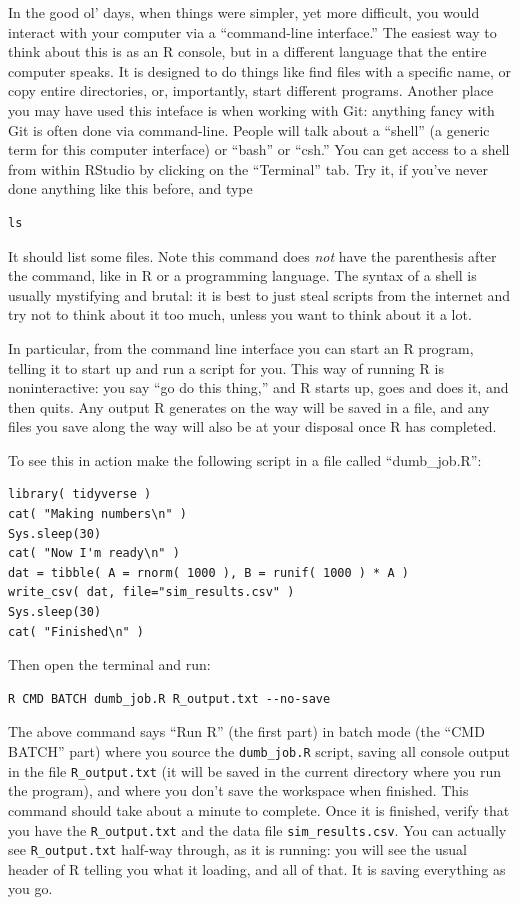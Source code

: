 \documentclass[
]{book}
\begin{document}
In the good ol' days, when things were simpler, yet more difficult, you would interact with your computer via a ``command-line interface.''
The easiest way to think about this is as an R console, but in a different language that the entire computer speaks.
It is designed to do things like find files with a specific name, or copy entire directories, or, importantly, start different programs.
Another place you may have used this inteface is when working with Git: anything fancy with Git is often done via command-line.
People will talk about a ``shell'' (a generic term for this computer interface) or ``bash'' or ``csh.''
You can get access to a shell from within RStudio by clicking on the ``Terminal'' tab.
Try it, if you've never done anything like this before, and type

\begin{verbatim}
ls
\end{verbatim}

It should list some files. Note this command does \emph{not} have the parenthesis after the command, like in R or a programming language.
The syntax of a shell is usually mystifying and brutal: it is best to just steal scripts from the internet and try not to think about it too much, unless you want to think about it a lot.

In particular, from the command line interface you can start an R program, telling it to start up and run a script for you.
This way of running R is noninteractive: you say ``go do this thing,'' and R starts up, goes and does it, and then quits.
Any output R generates on the way will be saved in a file, and any files you save along the way will also be at your disposal once R has completed.

To see this in action make the following script in a file called ``dumb\_job.R'':

\begin{verbatim}
library( tidyverse )
cat( "Making numbers\n" )
Sys.sleep(30)
cat( "Now I'm ready\n" )
dat = tibble( A = rnorm( 1000 ), B = runif( 1000 ) * A )
write_csv( dat, file="sim_results.csv" )
Sys.sleep(30)
cat( "Finished\n" )
\end{verbatim}

Then open the terminal and run:

\begin{verbatim}
R CMD BATCH dumb_job.R R_output.txt --no-save
\end{verbatim}

The above command says ``Run R'' (the first part) in batch mode (the ``CMD BATCH'' part) where you source the \texttt{dumb\_job.R} script, saving all console output in the file \texttt{R\_output.txt} (it will be saved in the current directory where you run the program), and where you don't save the workspace when finished.
This command should take about a minute to complete.
Once it is finished, verify that you have the \texttt{R\_output.txt} and the data file \texttt{sim\_results.csv}.
You can actually see \texttt{R\_output.txt} half-way through, as it is running: you will see the usual header of R telling you what it loading, and all of that.
It is saving everything as you go.
\end{document}
